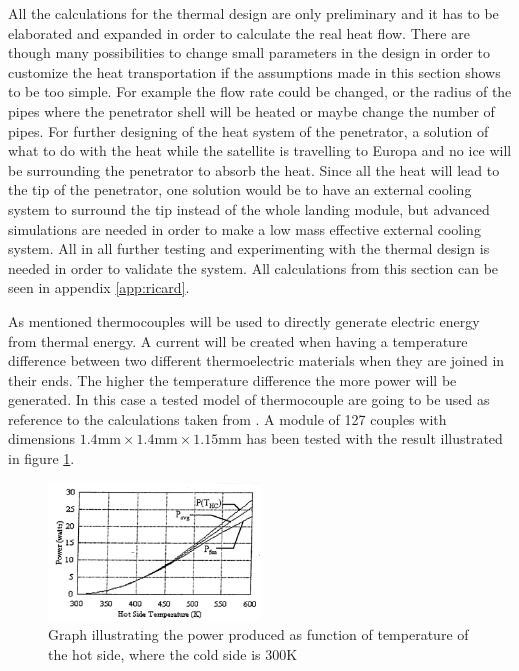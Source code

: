 \noindent
All the calculations for the thermal design are only preliminary and it has to be elaborated and expanded in order to calculate the real heat flow. There are though many possibilities to change small parameters in the design in order to customize the heat transportation if the assumptions made in this section shows to be too simple. For example the flow rate could be changed, or the radius of the pipes where the penetrator shell will be heated or maybe change the number of pipes. For further designing of the heat system of the penetrator, a solution of what to do with the heat while the satellite is travelling to Europa and no ice will be surrounding the penetrator to absorb the heat. Since all the heat will lead to the tip of the penetrator, one solution would be to have an external cooling system to surround the tip instead of the whole landing module, but advanced simulations are needed in order to make a low mass effective external cooling system.  All in all further testing and experimenting with the thermal design is needed in order to validate the system. All calculations from this section can be seen in appendix \ref{app:ricard}. 

 \label{sec:thermocouples}
As mentioned thermocouples will be used to directly generate electric energy from thermal energy. A current will be created when having a temperature difference between two different thermoelectric materials when they are joined in their ends. The higher the temperature difference the more power will be generated. In this case a tested model of thermocouple are going to be used as reference to the calculations taken from \cite{lau1997a}. A module of 127 couples with dimensions $1.4\text{mm}\times 1.4\text{mm}\times 1.15\text{mm}$ has been tested with the result illustrated in figure \ref{fig:thermocouple}.\\

\begin{figure}[htb]
  \begin{center}
  \includegraphics[width=0.5\textwidth]{figures/Ricardo/thermocouples}
  \caption{Graph illustrating the power produced as function of temperature of the hot side, where the cold side is 300K}
  \label{fig:thermocouple}
  \end{center}
\end{figure}

